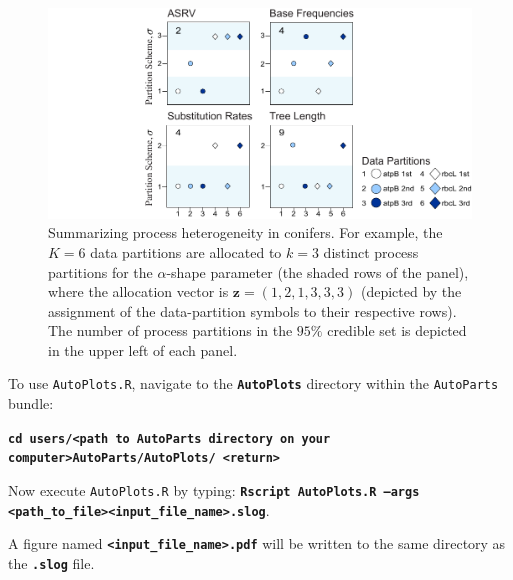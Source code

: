 \documentclass[11pt]{article}
\newcommand{\cl}[1]{{\texttt{\textbf{#1}}}}
\begin{document}
\begin{figure}[H] 
\centering 
\includegraphics[width=130mm]{./figures/partition_scheme.pdf} 
\caption{Summarizing process heterogeneity in conifers. 
For example, the $K=6$ data partitions are allocated to $k = 3$ distinct process partitions for the $\alpha$-shape parameter (the shaded rows of the panel), where the allocation vector is ${\mathbf z}  = (1,2,1,3,3,3)$ (depicted by the assignment of the data-partition symbols to their respective rows). The number of process partitions in the $95\%$ credible set is depicted in the upper left of each panel.}
\label{partition_scheme}
\end{figure} \vspace{-5mm}

To use \texttt{AutoPlots.R}, navigate to the \cl{AutoPlots} directory within the \verb!AutoParts! bundle: \vspace{-1.5mm}

\cl{cd users/<path to AutoParts directory on your computer>AutoParts/AutoPlots/ <return>}\vspace{-1.5mm}

Now execute \verb!AutoPlots.R! by typing: \cl{Rscript AutoPlots.R --args <path\_to\_file><input\_file\_name>.slog}. \vspace{-6.5mm}

A figure named \cl{<input\_file\_name>.pdf} will be written to the same directory as the \cl{.slog} file. \vspace{-1.5mm}

\bigskip
\end{document}
